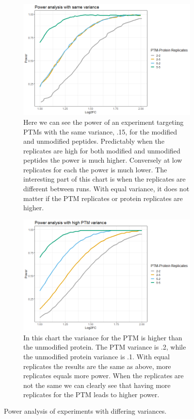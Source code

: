 \documentclass[mcp]{article}
\numberwithin{figure}{section} %
\numberwithin{table}{section}
\begin{document}
\begin{figure}[h!]
\centering
 \begin{subfigure}{\textwidth}
 \centering
	\includegraphics[width=.725\textwidth]{images/same_var_power}
	\caption{Here we can see the power of an experiment targeting PTMs with the same variance, .15, for the modified and unmodified peptides. Predictably when the replicates are high for both modified and unmodified peptides the power is much higher. Conversely at low replicates for each the power is much lower. The interesting part of this chart is when the replicates are different between runs. With equal variance, it does not matter if the PTM replicates or protein replicates are higher.}
 \end{subfigure}\vspace{5mm}
 \begin{subfigure}{\textwidth}
 \centering
	\includegraphics[width=.725\textwidth]{images/high_ptm_var_power}
	\caption{In this chart the variance for the PTM is higher than the unmodified protein. The PTM variance is .2, while the unmodified protein variance is .1. With equal replicates the results are the same as above, more replicates equals more power. When the replicates are not the same we can clearly see that having more replicates for the PTM leads to higher power.}
 \end{subfigure}
 \caption{Power analysis of experiments with differing variances.}
\label{fig:power_sd_combo}
\end{figure}
\end{document}
